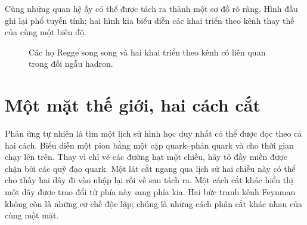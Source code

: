 Cùng những quan hệ ấy có thể được tách ra thành một sơ đồ rõ ràng. Hình đầu
ghi lại phổ tuyến tính; hai hình kia biểu diễn các khai triển theo kênh thay thế
của cùng một biên độ.

\begin{figure}[H]
  \centering
  \caption{Các họ Regge song song và hai khai triển theo kênh có liên quan trong
  đối ngẫu hadron.}
  \label{fig:l01-regge-duality-redraw}
\end{figure}

\section{Một mặt thế giới, hai cách cắt}

Phản ứng tự nhiên là tìm một lịch sử hình học duy nhất có thể được đọc
theo cả hai cách. Biểu diễn một pion bằng một cặp quark--phản quark và cho thời gian chạy
lên trên. Thay vì chỉ vẽ các đường hạt một chiều, hãy tô đầy miền
được chặn bởi các quỹ đạo quark. Một lát cắt ngang qua lịch sử hai chiều này
có thể cho thấy hai dây đi vào nhập lại rồi về sau tách ra. Một cách cắt khác
hiển thị một dây được trao đổi từ phía này sang phía kia. Hai bức tranh kênh Feynman
không còn là những cơ chế độc lập; chúng là những cách phân cắt khác nhau của cùng một mặt.

